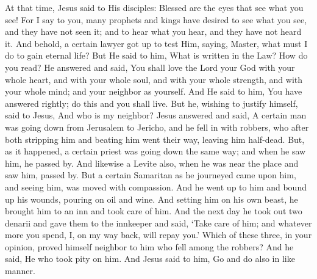{{At that time, Jesus said to His disciples: Blessed are the eyes that see what you see! For I say to you, many prophets and kings have desired to see what you see, and they have not seen it; and to hear what you hear, and they have not heard it. And behold, a certain lawyer got up to test Him, saying, Master, what must I do to gain eternal life? But He said to him, What is written in the Law? How do you read? He answered and said, You shall love the Lord your God with your whole heart, and with your whole soul, and with your whole strength, and with your whole mind; and your neighbor as yourself. And He said to him, You have answered rightly; do this and you shall live. But he, wishing to justify himself, said to Jesus, And who is my neighbor? Jesus answered and said, A certain man was going down from Jerusalem to Jericho, and he fell in with robbers, who after both stripping him and beating him went their way, leaving him half-dead. But, as it happened, a certain priest was going down the same way; and when he saw him, he passed by. And likewise a Levite also, when he was near the place and saw him, passed by. But a certain Samaritan as he journeyed came upon him, and seeing him, was moved with compassion. And he went up to him and bound up his wounds, pouring on oil and wine. And setting him on his own beast, he brought him to an inn and took care of him. And the next day he took out two denarii and gave them to the innkeeper and said, ‘Take care of him; and whatever more you spend, I, on my way back, will repay you.’ Which of these three, in your opinion, proved himself neighbor to him who fell among the robbers? And he said, He who took pity on him. And Jesus said to him, Go and do also in like manner.
  }
}
\newcommand{\offertory}{%
  Precátus est Moyses in conspéctu Dómini, Dei sui, et dixit: Quare, Dómine, irásceris in pópulo tuo? Parce iræ ánimæ tuæ: meménto Abraham, Isaac et Iacob, quibus iurásti dare terram fluéntem lac et mel. Et placátus factus est Dóminus de malignitáte, quam dixit fácere pópulo suo.
}
\newcommand{\offertoryTranslation}{%
  Moses prayed in the sight of the Lord his God and said, Why, O Lord, is Your indignation enkindled against Your people? Let the anger of Your mind cease; remember Abraham, Isaac, and Jacob, to whom You swore to give a land flowing with milk and honey. And the Lord was appeased from doing the evil which He had spoken of doing against His people.
}
\newcommand{\secret}{%
  \l{%
    Hóstias, quǽsumus, Dómine, propítius inténde, quas sacris altáribus exhibémus: ut, nobis indulgéntiam largiéndo, tuo nómini dent honórem.
  }
  \e{%
    O Lord, we beseech You, graciously look upon the offerings which we lay upon Your sacred altar; so that they may bring us plentiful forgiveness while they give honor to Your name.
  }
  \perDominum
}
